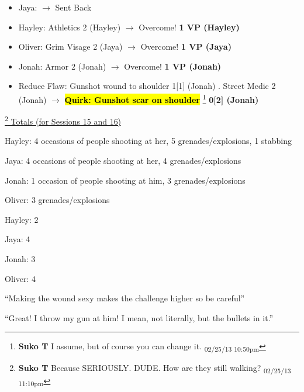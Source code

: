 \begin{itemize}
\item Jaya: $\rightarrow$ Sent Back
\item Hayley: Athletics 2 (Hayley) $\rightarrow$ Overcome! \textbf{1 VP (Hayley)}
\item Oliver: Grim Visage 2 (Jaya) $\rightarrow$ Overcome! \textbf{1 VP (Jaya)}
\item Jonah: Armor 2 (Jonah) $\rightarrow$ Overcome! \textbf{1 VP (Jonah)}
\end{itemize}

\begin{itemize}
\item  {\color[RGB]{255,0,0}Reduce Flaw: }  {\color[RGB]{255,0,0}Gunshot wound to shoulder}  {\color[RGB]{255,0,0} 1{[}1{]} (Jonah)} .  Street Medic 2 (Jonah) $\rightarrow$ \textbf{ {\color[RGB]{255,0,0}\hl{Quirk: Gunshot scar on shoulder}} }\footnote{\textbf{Suko T }I assume, but of course you can change it. \textsubscript{02/25/13 10:50pm}}\textbf{ {\color[RGB]{255,0,0}0{[}2{]} (Jonah)} }
\end{itemize}


\footnote{\textbf{Suko T }Because SERIOUSLY.  DUDE.  How are they still walking? \textsubscript{02/25/13 11:10pm}}\underline{  Totals (for Sessions 15 and 16) }

Hayley: 4 occasions of people shooting at her, 5 grenades/explosions, 1 stabbing

Jaya: 4 occasions of people shooting at her, 4 grenades/explosions

Jonah: 1 occasion of people shooting at him,  3 grenades/explosions

Oliver: 3 grenades/explosions




{
\parskip=0pt
Hayley: 2

Jaya: 4

Jonah: 3

Oliver: 4
}





``Making the wound sexy makes the challenge higher so be careful''




``Great!  I throw my gun at him!  I mean, not literally, but the bullets in it.''

